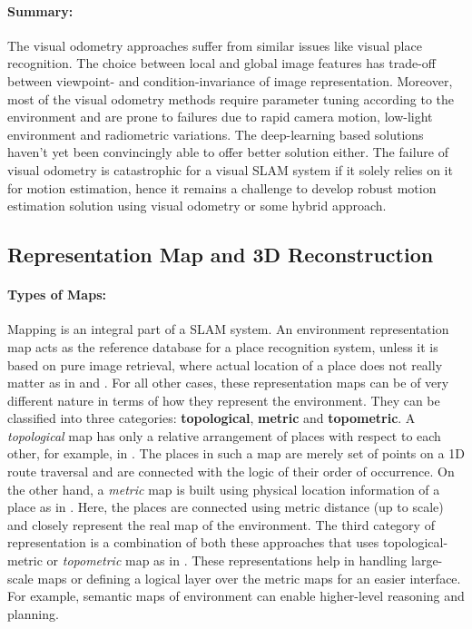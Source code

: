 \documentclass{article}
\begin{document}
\paragraph{Summary:}
The visual odometry approaches suffer from similar issues like visual place recognition. The choice between local and global image features has trade-off between viewpoint- and condition-invariance of image representation. Moreover, most of the visual odometry methods require parameter tuning according to the environment and are prone to failures due to rapid camera motion, low-light environment and radiometric variations. The deep-learning based solutions haven't yet been convincingly able to offer better solution either. The failure of visual odometry is catastrophic for a visual SLAM system if it solely relies on it for motion estimation, hence it remains a challenge to develop robust motion estimation solution using visual odometry or some hybrid approach.

\subsection{Representation Map and 3D Reconstruction}
\paragraph{Types of Maps:}
Mapping is an integral part of a SLAM system. An environment representation map acts as the reference database for a place recognition system, unless it is based on pure image retrieval, where actual location of a place does not really matter as in \cite{Cummins2010} and \cite{Nister2006}. For all other cases, these representation maps can be of very different nature in terms of how they represent the environment. They can be classified into three categories: \textbf{topological}, \textbf{metric} and \textbf{topometric}. A \emph{topological} map has only a relative arrangement of places with respect to each other, for example, in \cite{Lui2012, Milford2012}. The places in such a map are merely set of points on a 1D route traversal and are connected with the logic of their order of occurrence. On the other hand, a \emph{metric} map is built using physical location information of a place as in \cite{Gutmann2008, Klein2007}. Here, the places are connected using metric distance (up to scale) and closely represent the real map of the environment. The third category of representation is a combination of both these approaches that uses topological-metric or \emph{topometric} map as in \cite{Angeli2009, Bazeille2011, Konolige2011}. These representations help in handling large-scale maps or defining a logical layer over the metric maps for an easier interface. For example, semantic maps of environment \cite{sunderhauf2016place,flint2010growing} can enable higher-level reasoning and planning.
\end{document}
